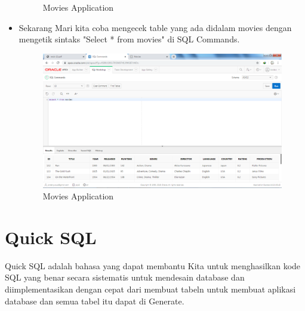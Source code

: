 \documentclass[12pt, times new roman]{article}
\begin{document}
\begin{itemize}
\begin{figure}[!htpb]
	\caption{Movies Application}
\end{figure}
\item Sekarang Mari kita coba mengecek table yang ada didalam movies dengan mengetik sintaks "Select * from movies" di SQL Commands.
\begin{figure}[!htpb]
	\centering
	\includegraphics[width=12cm]{figures/Screenshot_10.png}
	\caption{Movies Application}
\end{figure}
\end{itemize}
\section{Quick SQL}
Quick SQL adalah bahasa yang dapat membantu Kita untuk menghasilkan kode SQL yang benar secara sistematis untuk mendesain database dan diimplementasikan dengan cepat dari membuat tabeln untuk membuat aplikasi database dan semua tabel itu dapat di Generate.\\
\end{document}
